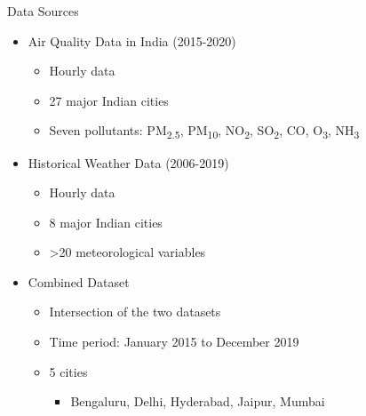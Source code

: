 \documentclass[svgnames, 12pt]{beamer}
\begin{document}
\begin{frame}{Data Sources}
    \begin{itemize}
       \item Air Quality Data in India (2015-2020)
           \begin{itemize}
               \item Hourly data
               \item 27 major Indian cities
               \item Seven pollutants: PM\textsubscript{2.5}, PM\textsubscript{10}, NO\textsubscript{2}, SO\textsubscript{2}, CO, O\textsubscript{3}, NH\textsubscript{3}
           \end{itemize}
       \vspace{0.5em}
       \item Historical Weather Data (2006-2019)
           \begin{itemize}
               \item Hourly data
               \item 8 major Indian cities
               \item >20 meteorological variables
           \end{itemize}
       \vspace{0.5em}
       \item Combined Dataset
           \begin{itemize}
               \item Intersection of the two datasets
               \item Time period: January 2015 to December 2019
               \item 5 cities
                   \begin{itemize}
                       \item Bengaluru, Delhi, Hyderabad, Jaipur, Mumbai
                   \end{itemize}
           \end{itemize}
    \end{itemize}
    \vfill
\end{frame}
\end{document}
